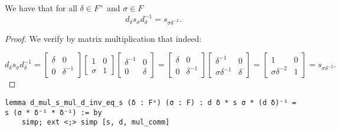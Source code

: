 \begin{lemma}
\label{SpecialMatrices.d_mul_s_mul_d_inv_eq_s}
\leanok
    We have that for all $\delta \in F^\times$ and $\sigma \in F$
    \[
    d_\delta s_\sigma d^{-1}_\delta = s_{\sigma \delta^{-2}}.
    \]
\end{lemma}
\begin{proof}
\leanok
    We verify by matrix multiplication that indeed:

    \begin{equation*}
        d_\delta s_\sigma d^{-1}_\delta = \! \begin{bmatrix} \delta & 0 \\ 0 & \delta^{-1} \end{bmatrix} \begin{bmatrix} 1 & 0 \\ \sigma & 1 \end{bmatrix} \begin{bmatrix} \delta^{-1} & 0 \\ 0 & \delta \end{bmatrix} = \begin{bmatrix} \delta & 0 \\ 0 & \delta^{-1} \end{bmatrix} \! \begin{bmatrix} \delta^{-1} & 0 \\ \sigma \delta^{-1} & \delta \end{bmatrix} \! = \! \begin{bmatrix} 1 & 0 \\ \sigma \delta^{-2} & 1 \end{bmatrix} \! = s_{\sigma \delta^{-2}}.
    \end{equation*}
\end{proof}
\begin{footnotesize}
\begin{verbatim}
lemma d_mul_s_mul_d_inv_eq_s (δ : Fˣ) (σ : F) : d δ * s σ * (d δ)⁻¹ = s (σ * δ⁻¹ * δ⁻¹) := by
    simp; ext <;> simp [s, d, mul_comm]
\end{verbatim}
\end{footnotesize}



